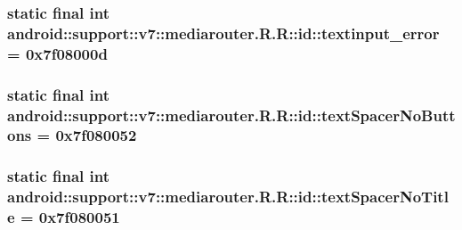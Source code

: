 \hypertarget{classandroid_1_1support_1_1v7_1_1mediarouter_1_1_r_1_1id_2dd6e86aa87da0a308a88b81b4b9a428}{
\subsubsection[{textinput\_\-error}]{\setlength{\rightskip}{0pt plus 5cm}static final int android::support::v7::mediarouter.R.R::id::textinput\_\-error = 0x7f08000d}}
\label{classandroid_1_1support_1_1v7_1_1mediarouter_1_1_r_1_1id_2dd6e86aa87da0a308a88b81b4b9a428}


\hypertarget{classandroid_1_1support_1_1v7_1_1mediarouter_1_1_r_1_1id_62810d51b00ebb19ae3c3bde1da32b63}{
\subsubsection[{textSpacerNoButtons}]{\setlength{\rightskip}{0pt plus 5cm}static final int android::support::v7::mediarouter.R.R::id::textSpacerNoButtons = 0x7f080052}}
\label{classandroid_1_1support_1_1v7_1_1mediarouter_1_1_r_1_1id_62810d51b00ebb19ae3c3bde1da32b63}


\hypertarget{classandroid_1_1support_1_1v7_1_1mediarouter_1_1_r_1_1id_64c3344bc2ee36520270b4df94beca1b}{
\subsubsection[{textSpacerNoTitle}]{\setlength{\rightskip}{0pt plus 5cm}static final int android::support::v7::mediarouter.R.R::id::textSpacerNoTitle = 0x7f080051}}
\label{classandroid_1_1support_1_1v7_1_1mediarouter_1_1_r_1_1id_64c3344bc2ee36520270b4df94beca1b}


